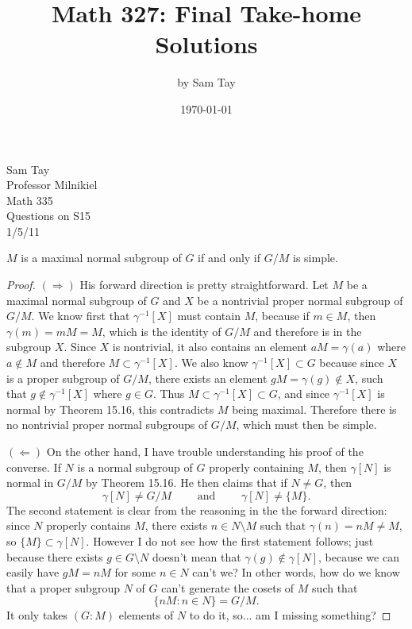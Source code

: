 \documentclass{article}
\title{Math 327: Final Take-home Solutions}
\author{by Sam Tay}
\date{\today}
\newenvironment{theorem}[1]{\noindent {\bf Theorem #1:}}
{\medskip}
\begin{document}
\begin{flushright}Sam Tay\\ Professor Milnikiel \\ Math 335 \\ Questions on S15\\ 1/5/11
\end{flushright}

\begin{theorem}{15.18} $M$ is a maximal normal subgroup of $G$ if and only if $G/M$ is simple.\end{theorem}
\begin{proof} $(\Rightarrow)$ His forward direction is pretty straightforward. Let $M$ be a maximal normal subgroup of $G$ and $X$ be a nontrivial proper normal subgroup of $G/M$. We know first that $\gamma^{-1}[X]$ must contain $M$, because if $m\in M$, then $\gamma(m)=mM=M$, which is the identity of $G/M$ and therefore is in the subgroup $X$. Since $X$ is nontrivial, it also contains an element $aM=\gamma(a)$ where $a\notin M$ and therefore $M\subset \gamma^{-1}[X] $. We also know $\gamma^{-1}[X]\subset G$ because since $X$ is a proper subgroup of $G/M$, there exists an element $gM=\gamma(g)\notin X$, such that $g\notin \gamma^{-1}[X]$ where $g\in G$. Thus $M\subset\gamma^{-1}[X]\subset G$, and since $\gamma^{-1}[X]$ is normal by Theorem 15.16, this contradicts $M$ being maximal. Therefore there is no nontrivial proper normal subgroups of $G/M$, which must then be simple.

$(\Leftarrow)$ On the other hand, I have trouble understanding his proof of the converse. If $N$ is a normal subgroup of $G$ properly containing $M$, then $\gamma[N]$ is normal in $G/M$ by Theorem 15.16. He then claims that if $N\ne G$, then $$\gamma[N]\ne G/M \quad\quad\text{ and }\quad\quad \gamma[N]\ne \{M\}.$$ The second statement is clear from the reasoning in the the forward direction: since $N$ properly contains $M$, there exists $n\in N\setminus M$ such that $\gamma(n)=nM\ne M$, so $\{M\}\subset \gamma[N]$. However I do not see how the first statement follows; just because there exists $g\in G\setminus N$ doesn't mean that $\gamma(g)\notin \gamma[N]$, because we can easily have $gM=nM$ for some $n\in N$ can't we? In other words, how do we know that  a proper subgroup $N$ of $G$ can't generate the cosets of $M$ such that $$\{nM : n\in N\}=G/M.$$ It only takes $(G:M)$ elements of $N$ to do it, so... am I missing something?
\end{proof}
\end{document}

